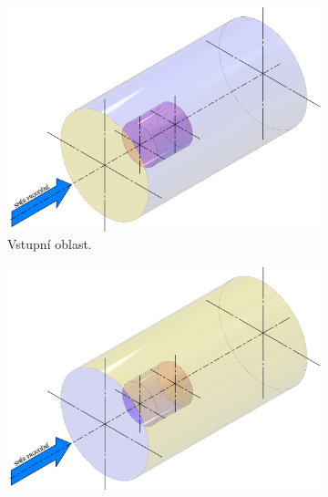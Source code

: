 	     \begin{figure}[ht!]
                    \centering
                        \begin{subfigure}{0.3\textwidth}
                             \centering
                             \captionsetup{width=.9\linewidth}
                                \includegraphics[width=\textwidth]{300_VYPOCETNI_MODEL/op-inlet.png}
                             \caption{Vstupní oblast.}
                             \label{fig:inlet}
                         \end{subfigure}
                         \begin{subfigure}{0.3\textwidth}
                             \centering
                             \captionsetup{width=.9\linewidth}
                             \includegraphics[width=\textwidth]{300_VYPOCETNI_MODEL/op-farfield.png}

\end{subfigure}
\end{figure}
